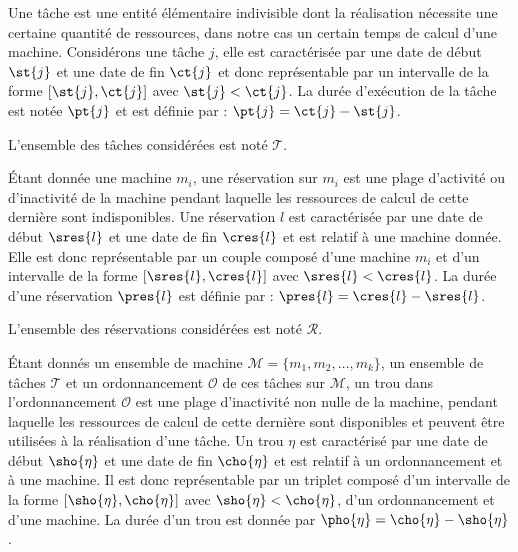 \documentclass[a4paper,11pt]{thesis}
\begin{document}
%




\begin{ndf}[Tâche]
    Une tâche est une entité élémentaire indivisible dont la réalisation nécessite une certaine
    quantité de ressources, dans notre cas un certain temps de calcul d'une machine. Considérons une
    tâche $j$, elle est caractérisée par une date de début $\st{j}$ et une date de fin $\ct{j}$ et donc
    représentable par un intervalle de la forme $[\st{j}, \ct{j}]$ avec $\st{j} < \ct{j}$. La durée d'exécution
    de la tâche est notée $\pt{j}$ et est définie par : $\pt{j} = \ct{j} - \st{j}$.

    L'ensemble des tâches considérées est noté $\mathcal{T}$.
\end{ndf}

\begin{ndf}[Réservation]
    Étant donnée une machine $m_i$, une réservation sur $m_i$ est une plage d'activité ou
    d'inactivité de la machine pendant laquelle les ressources de calcul de cette dernière sont
    indisponibles. Une réservation $l$ est caractérisée par une date de début $\sres{l}$ et une date de fin
    $\cres{l}$ et est relatif à une machine donnée. Elle est donc représentable par un couple composé
    d'une machine $m_i$ et d'un intervalle de la forme $[\sres{l}, \cres{l}]$ avec $\sres{l} < \cres{l}$.
    La durée d'une réservation $\pres{l}$ est définie par :  $\pres{l} = \cres{l} - \sres{l}$.

    L'ensemble des réservations considérées est noté $\mathcal{R}$.
\end{ndf}

\begin{ndf}[Trou]
    Étant donnés un ensemble de machine $\mathcal{M} = \{m_1, m_2, \dots, m_k\}$, un ensemble de
    tâches $\mathcal{T}$ et un ordonnancement $\mathcal{O}$ de ces tâches sur $\mathcal{M}$, un trou
    dans l'ordonnancement $\mathcal{O}$ est une plage d'inactivité non nulle de la machine, pendant
    laquelle les ressources de calcul de cette dernière sont disponibles et peuvent être utilisées à
    la réalisation d'une tâche. Un trou $\eta$ est caractérisé par une date de début $\sho{\eta}$ et
    une date de fin $\cho{\eta}$ et est relatif à un ordonnancement et à une machine. Il est donc
    représentable par un triplet composé d'un intervalle de la forme $[\sho{\eta}, \cho{\eta}]$ avec
    $\sho{\eta} < \cho{\eta}$, d'un ordonnancement et d'une machine. La durée d'un trou est donnée
    par $\pho{\eta} = \cho{\eta} - \sho{\eta}$.
\end{ndf}
\end{document}
